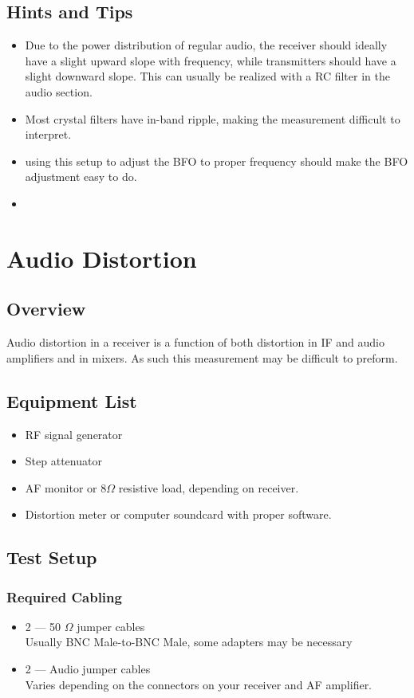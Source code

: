 \documentclass[10pt,letterpaper]{book}
\begin{document}
\subsection*{Hints and Tips}
\begin{itemize}
	\item Due to the power distribution of regular audio, the receiver should ideally have a slight upward slope with frequency, while transmitters should have a slight downward slope. This can usually be realized with a RC filter in the audio section.
	\item Most crystal filters have in-band ripple, making the  measurement difficult to interpret.  
	\item using this setup to adjust the BFO to proper frequency should make the BFO adjustment easy to do. 
	\item %
\end{itemize}

\newpage
\section{Audio Distortion}
% 
\subsection*{Overview }
Audio distortion in a receiver is a function of both distortion in IF and audio amplifiers and in mixers. As such this measurement may be difficult to preform. 
\subsection*{Equipment List}
\begin{itemize}
	\item RF signal generator
	\item Step attenuator
	\item AF monitor or 8$\Omega$ resistive load, depending on receiver.
	\item Distortion meter or computer soundcard with proper software.
\end{itemize}
\subsection*{Test Setup}
\subsubsection*{Required Cabling}
\begin{itemize}
	\item 2 --- 50 $\Omega$ jumper cables \\
		Usually BNC Male-to-BNC Male, some adapters may be necessary
		\item 2 --- Audio jumper cables \\
		Varies depending on the connectors on your receiver and AF amplifier.
\end{itemize}
\end{document}
